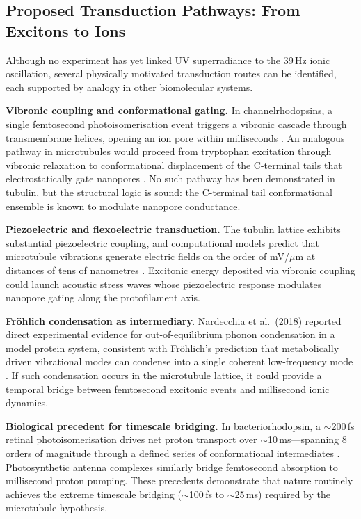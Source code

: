 \documentclass[10pt, a4paper, twocolumn]{article}
\begin{document}
\subsection{Proposed Transduction Pathways: From Excitons to Ions}

Although no experiment has yet linked UV superradiance to the 39\,Hz
ionic oscillation, several physically motivated transduction routes
can be identified, each supported by analogy in other biomolecular
systems.

\textbf{Vibronic coupling and conformational gating.} In
channelrhodopsins, a single femtosecond photoisomerisation event
triggers a vibronic cascade through transmembrane helices, opening an
ion pore within milliseconds \cite{lorenzfonfria2013}. An analogous
pathway in microtubules would proceed from tryptophan excitation
through vibronic relaxation to conformational displacement of the
C-terminal tails that electrostatically gate nanopores
\cite{freedman2010}. No such pathway has been demonstrated in
tubulin, but the structural logic is sound: the C-terminal tail
conformational ensemble is known to modulate nanopore conductance.

\textbf{Piezoelectric and flexoelectric transduction.} The tubulin
lattice exhibits substantial piezoelectric coupling, and computational
models predict that microtubule vibrations generate electric fields on
the order of mV/$\mu$m at distances of tens of nanometres
\cite{thackston2019}. Excitonic energy deposited via vibronic coupling
could launch acoustic stress waves whose piezoelectric response
modulates nanopore gating along the protofilament axis.

\textbf{Fr\"ohlich condensation as intermediary.} Nardecchia et al.\
(2018) reported direct experimental evidence for out-of-equilibrium
phonon condensation in a model protein system, consistent with
Fr\"ohlich's prediction that metabolically driven vibrational modes
can condense into a single coherent low-frequency mode
\cite{nardecchia2018}. If such condensation occurs in the microtubule
lattice, it could provide a temporal bridge between femtosecond
excitonic events and millisecond ionic dynamics.

\textbf{Biological precedent for timescale bridging.} In
bacteriorhodopsin, a $\sim$200\,fs retinal photoisomerisation drives
net proton transport over $\sim$10\,ms---spanning 8 orders of
magnitude through a defined series of conformational intermediates
\cite{nogly2018}. Photosynthetic antenna complexes similarly bridge
femtosecond absorption to millisecond proton pumping. These precedents
demonstrate that nature routinely achieves the extreme timescale
bridging ($\sim$100\,fs to $\sim$25\,ms) required by the microtubule
hypothesis.
\end{document}

